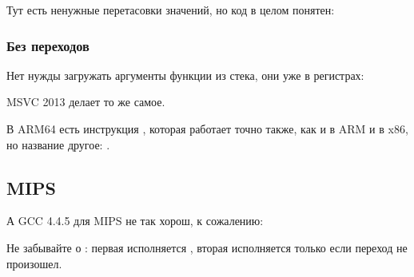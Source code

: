 

Тут есть ненужные перетасовки значений, но код в целом понятен:



\subsubsection{Без переходов}

Нет нужды загружать аргументы функции из стека, они уже в регистрах:



MSVC 2013 делает то же самое.

В ARM64 есть инструкция , которая работает точно также, как и  в ARM и  в x86,
но название другое: .



\ifdefined\IncludeMIPS
\subsection{MIPS}

А GCC 4.4.5 для MIPS не так хорош, к сожалению:



Не забывайте о : первая  исполняется  ,
вторая  исполняется только если переход не произошел.

\fi %

